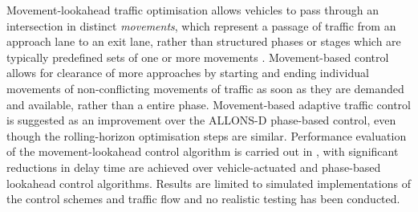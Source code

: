 Movement-lookahead traffic optimisation allows vehicles to pass through an intersection in distinct \emph{movements}, which represent a passage of traffic from an approach lane to an exit lane, rather than structured phases or stages which are typically predefined sets of one or more movements  \cite{van2008movement,pandit2013adaptive}. Movement-based control allows for clearance of more approaches by starting and ending individual movements of non-conflicting movements of traffic as soon as they are demanded and available, rather than a entire phase. Movement-based adaptive traffic control is suggested as an improvement over the ALLONS-D phase-based control, even though the rolling-horizon optimisation steps are similar. Performance evaluation of the movement-lookahead control algorithm is carried out in \cite{van2008movement}, with significant reductions in delay time are achieved over vehicle-actuated and phase-based lookahead control algorithms. Results are limited to simulated implementations of the control schemes and traffic flow and no realistic testing has been conducted.








